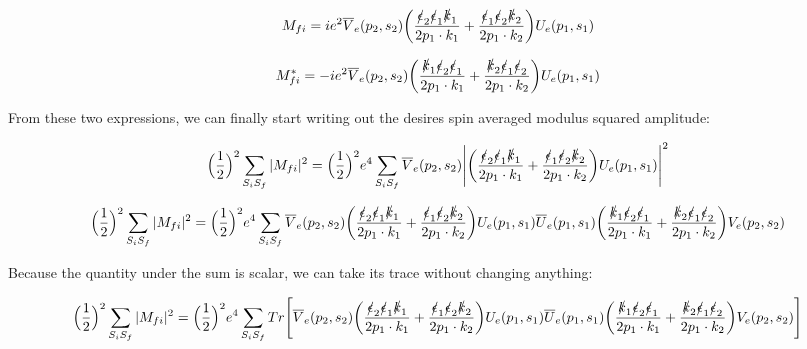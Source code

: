 \documentclass[a4]{article}
\begin{document}
    \begin{equation}
        M_{fi} = i e^2 \overline{V}_e (p_2, s_2) \bigg( \frac{\slashed{\epsilon}_2 \slashed{\epsilon}_1 \slashed{k}_1}{2 p_1 \cdot k_1}  + \frac{\slashed{\epsilon}_1 \slashed{\epsilon}_2 \slashed{k}_2}{2 p_1 \cdot k_2} \bigg) U_e (p_1, s_1)
    \end{equation}

    \begin{equation}
        M_{fi}^* = - i e^2 \overline{V}_e (p_2, s_2) \bigg( \frac{\slashed{k}_1 \slashed{\epsilon}_2 \slashed{\epsilon}_1}{2 p_1 \cdot k_1}  + \frac{\slashed{k}_2 \slashed{\epsilon}_1 \slashed{\epsilon}_2}{2 p_1 \cdot k_2} \bigg) U_e (p_1, s_1)
    \end{equation}

    From these two expressions, we can finally start writing out the desires spin averaged modulus squared amplitude:

    \begin{equation}
        \Big( \frac{1}{2} \Big)^2 \sum_{S_i S_f} |M_{fi}|^2 = \Big( \frac{1}{2} \Big)^2 e^4 \sum_{S_i S_f} \overline{V}_e (p_2, s_2) \Bigg| \bigg( \frac{\slashed{\epsilon}_2 \slashed{\epsilon}_1 \slashed{k}_1}{2 p_1 \cdot k_1}  + \frac{\slashed{\epsilon}_1 \slashed{\epsilon}_2 \slashed{k}_2}{2 p_1 \cdot k_2} \bigg) U_e (p_1, s_1) \Bigg|^2
    \end{equation}

    \begin{equation}
        \Big( \frac{1}{2} \Big)^2 \sum_{S_i S_f} |M_{fi}|^2 = \Big( \frac{1}{2} \Big)^2 e^4 \sum_{S_i S_f} \overline{V}_e (p_2, s_2) \bigg( \frac{\slashed{\epsilon}_2 \slashed{\epsilon}_1 \slashed{k}_1}{2 p_1 \cdot k_1}  + \frac{\slashed{\epsilon}_1 \slashed{\epsilon}_2 \slashed{k}_2}{2 p_1 \cdot k_2} \bigg) U_e (p_1, s_1) \overline{U}_e (p_1, s_1) \bigg( \frac{\slashed{k}_1 \slashed{\epsilon}_2 \slashed{\epsilon}_1}{2 p_1 \cdot k_1}  + \frac{\slashed{k}_2 \slashed{\epsilon}_1 \slashed{\epsilon}_2}{2 p_1 \cdot k_2} \bigg) V_e (p_2, s_2)
    \end{equation}

    Because the quantity under the sum is scalar,  we can take its trace without changing anything:

    \begin{equation}
        \Big( \frac{1}{2} \Big)^2 \sum_{S_i S_f} |M_{fi}|^2 = \Big( \frac{1}{2} \Big)^2 e^4 \sum_{S_i S_f} Tr \Bigg[ \overline{V}_e (p_2, s_2) \bigg( \frac{\slashed{\epsilon}_2 \slashed{\epsilon}_1 \slashed{k}_1}{2 p_1 \cdot k_1}  + \frac{\slashed{\epsilon}_1 \slashed{\epsilon}_2 \slashed{k}_2}{2 p_1 \cdot k_2} \bigg) U_e (p_1, s_1) \overline{U}_e (p_1, s_1) \bigg( \frac{\slashed{k}_1 \slashed{\epsilon}_2 \slashed{\epsilon}_1}{2 p_1 \cdot k_1}  + \frac{\slashed{k}_2 \slashed{\epsilon}_1 \slashed{\epsilon}_2}{2 p_1 \cdot k_2} \bigg) V_e (p_2, s_2) \Bigg]
    \end{equation}
\end{document}
